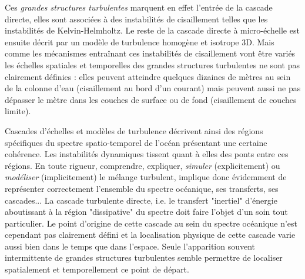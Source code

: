 Ces \textit{grandes structures turbulentes} marquent en effet l'entrée de la cascade directe, elles sont associées à des instabilités de cisaillement telles que les instabilités de Kelvin-Helmholtz. Le reste de la cascade directe à micro-échelle est ensuite décrit par un modèle de turbulence homogène et isotrope 3D. Mais comme les mécanismes entraînant ces instabilités de cisaillement vont être variés les échelles spatiales et temporelles des grandes structures turbulentes ne sont pas clairement définies : elles peuvent atteindre quelques dizaines de mètres au sein de la colonne d'eau (cisaillement au bord d'un courant) mais peuvent aussi ne pas dépasser le mètre dans les couches de surface ou de fond (cisaillement de couches limite).

Cascades d'échelles et modèles de turbulence décrivent ainsi des régions spécifiques du spectre spatio-temporel de l'océan présentant une certaine cohérence. Les instabilités dynamiques tissent quant à elles des ponts entre ces régions. En toute rigueur, comprendre, expliquer, \textit{simuler} (explicitement) ou \textit{modéliser} (implicitement) le mélange turbulent, implique donc évidemment de représenter correctement l'ensemble du spectre océanique, ses transferts, ses cascades... La cascade turbulente directe, i.e. le transfert "inertiel" d'énergie aboutissant à la région "dissipative" du spectre doit faire l'objet d'un soin tout particulier. Le point d'origine de cette cascade au sein du spectre océanique n'est cependant pas clairement défini et la localisation physique de cette cascade varie aussi bien dans le temps que dans l'espace. Seule l'apparition souvent intermittente de grandes structures turbulentes semble permettre de localiser spatialement et temporellement ce point de départ.

